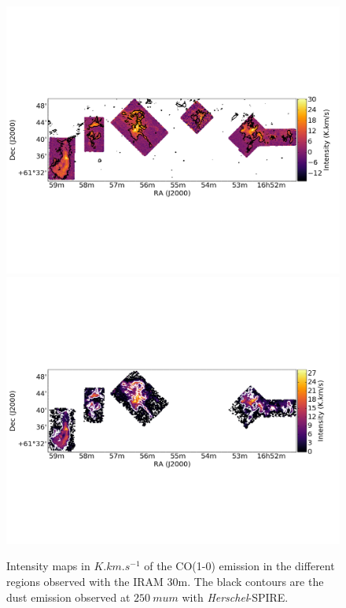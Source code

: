 \documentclass[traditabstract]{aa}
\begin{document}
\begin{figure}[h]
  \centering
  \includegraphics[width=\linewidth,trim=0 250 0 250,clip=true]{Figures/Draco_FRONT_stack.png} \\
  \includegraphics[width=\linewidth,trim=0 250 0 250,clip=true]{Figures/Draco_FRONT_intensity.png}
  \caption{\label{Draco_CO10} Intensity maps in $K.km.s^{-1}$ of the CO(1-0) emission in the different regions observed with the IRAM 30m. The black contours are the dust emission observed at $250\: mu m$ with \emph{Herschel}-SPIRE.}
\end{figure}
\end{document}
